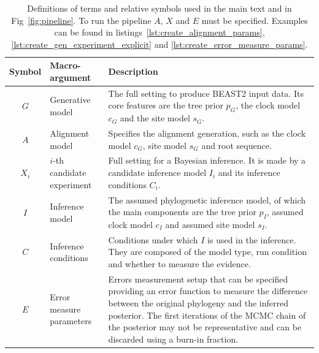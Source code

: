 \begin{table}
  \begin{tabular}{|@{}c|p{4cm}|p{12.2cm}|}
    \hline
    \centering
    \textbf{Symbol} &
    \textbf{Macro-argument} &
    \textbf{Description} \\
    \hline
    $\mathit{G}$ &
    Generative model &
    The full setting to produce BEAST2 input data. 
    Its core features are the tree prior $\mathit{p_{G}}$, the clock 
    model $\mathit{c_{G}}$ and the site model $\mathit{s_{G}}$. \\
    $\mathit{A}$ &
    Alignment model &
    Specifies the alignment generation, such as the clock model 
    $\mathit{c_{G}}$, site model $\mathit{s_{G}}$ and root sequence. \\
    $\mathit{X_{i}}$ &
    $i$-th candidate experiment &
    Full setting for a Bayesian inference. It is made by a 
    candidate inference model $\mathit{I_{i}}$ and its 
    inference conditions $\mathit{C_{i}}$. \\
    $\mathit{I}$ &
    Inference model &
    The assumed phylogenetic inference model, of which the main components
    are the tree prior $\mathit{p_{I}}$, assumed clock model $\mathit{c_{I}}$ 
    and assumed site model $\mathit{s_{I}}$. \\
    $\mathit{C}$ & Inference conditions & Conditions under which $\mathit{I}$ 
    is used in the inference. 
    They are composed of the model type, run condition and 
    whether to measure the evidence. \\
    $\mathit{E}$ & Error measure parameters & 
    Errors measurement setup that can be specified providing an 
    error function to measure the difference between the original phylogeny 
    and the inferred posterior. The first iterations of the MCMC chain of the posterior may not be representative and can be discarded using a burn-in fraction. \\
    \hline 
  \end{tabular}
  \caption{
    Definitions of terms and relative symbols used in the main text and in 
    Fig~\ref{fig:pipeline}. To run the pipeline $\mathit{A}$, $\mathit{X}$ 
    and $\mathit{E}$ must be specified. Examples can be found in 
    listings~\ref{lst:create_alignment_params}, 
    \ref{lst:create_gen_experiment_explicit} and 
    \ref{lst:create_error_measure_params}.
  }
  \label{tab:definitions}
\end{table}

